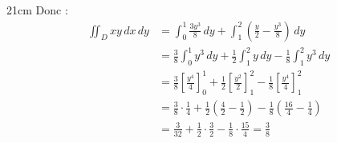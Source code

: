 \begin{parts}
\begin{solutionbox}{21cm}
        Donc :
        \begin{align*}
            \iint_D xy \, dx \, dy &= \int_0^1 \frac{3y^3}{8} \, dy + \int_1^2 \left( \frac{y}{2} - \frac{y^3}{8} \right) \, dy\\
            &= \frac{3}{8} \int_0^1 y^3 \, dy + \frac{1}{2} \int_1^2 y \, dy - \frac{1}{8} \int_1^2 y^3 \, dy\\
            &= \frac{3}{8} \left[ \frac{y^4}{4} \right]_0^1 + \frac{1}{2} \left[ \frac{y^2}{2} \right]_1^2 - \frac{1}{8} \left[ \frac{y^4}{4} \right]_1^2\\
            &= \frac{3}{8} \cdot \frac{1}{4} + \frac{1}{2} \left( \frac{4}{2} - \frac{1}{2} \right) - \frac{1}{8} \left( \frac{16}{4} - \frac{1}{4} \right)\\
            &= \frac{3}{32} + \frac{1}{2} \cdot \frac{3}{2} - \frac{1}{8} \cdot \frac{15}{4}
            = \frac{3}{8}
        \end{align*}
    \end{solutionbox}
\end{parts}
